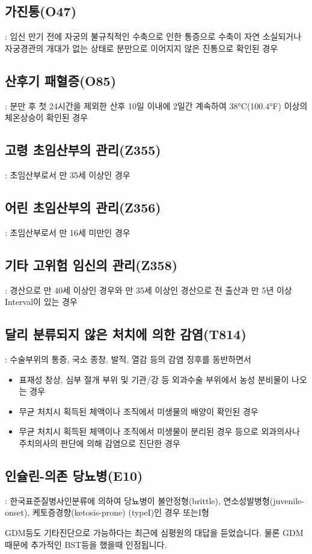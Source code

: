 \prezi{\clearpage}

\subsection*{가진통(O47)}
 : 임신 만기 전에 자궁의 불규칙적인 수축으로 인한 통증으로 수축이 자연 소실되거나 자궁경관의 개대가 없는 상태로 분만으로 이어지지 않은 진통으로 확인된 경우
\prezi{\clearpage}
\subsection*{산후기 패혈증(O85)} : 분만 후 첫 24시간을 제외한 산후 10일 이내에 2일간 계속하여 38°C(100.4°F) 이상의 체온상승이 확인된 경우
\prezi{\clearpage}
\subsection*{고령 초임산부의 관리(Z355)} : 초임산부로서 만 35세 이상인 경우 \label{oldprimi} 
\subsection*{어린 초임산부의 관리(Z356)} : 초임산부로서 만 16세 미만인 경우 \label{youngprimi} 
\subsection*{기타 고위험 임신의 관리(Z358)} : 경산으로 만 40세 이상인 경우와 만 35세 이상인 경산으로 전 출산과 만 5년 이상 Interval이 있는 경우 \label{otherhigh} 
\prezi{\clearpage}
\subsection*{달리 분류되지 않은 처치에 의한 감염(T814)} : 수술부위의 통증, 국소 종창, 발적, 열감 등의 감염 징후를 동반하면서
\begin{itemize}\tightlist
\item 표재성 창상, 심부 절개 부위 및 기관/강 등 외과수술 부위에서 농성 분비물이 나오는 경우
\item 무균 처치시 획득된 체액이나 조직에서 미생물의 배양이 확인된 경우
\item 무균 처치시 획득된 체액이나 조직에서 미생물이 분리된 경우 등으로 외과의사나 주치의사의 판단에 의해 감염으로 진단한 경우
\end{itemize}
\prezi{\clearpage}
\subsection*{인슐린-의존 당뇨병(E10)} : 한국표준질병사인분류에 의하여 당뇨병이 불안정형(brittle), 연소성발병형(juvenile-onset), 케토증경향(ketosis-prone) (typeI)인 경우 또는I형
\begin{shaded}
GDM등도 기타진단으로 가능하다는 최근에 심평원의 대답을 듣었습니다. 물론 GDM때문에 추가적인 BST등을 했을때 인정됩니다.
\end{shaded}

